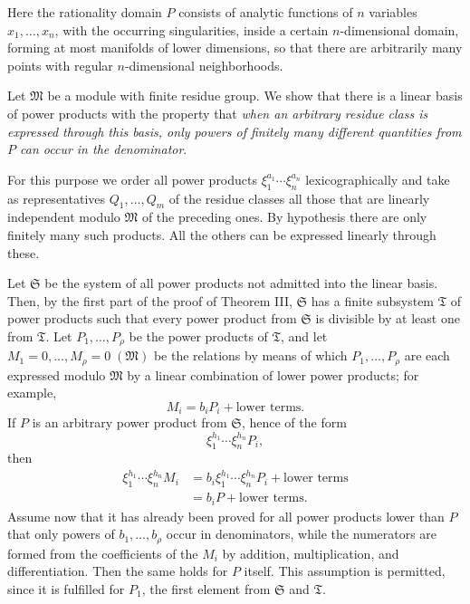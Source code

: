 \documentclass[11pt]{article}
\begin{document}
Here the rationality domain $P$ consists of analytic functions of $n$ variables $x_1,
\ldots,x_n$, with the occurring singularities, inside a certain $n$-dimensional domain, forming at most manifolds of lower dimensions, so that there are arbitrarily many points with regular $n$-dimensional neighborhoods.

Let $\mathfrak M$ be a module with finite residue group. We show that there is a linear basis of power products with the property that \emph{when an arbitrary residue class is expressed through this basis, only powers of finitely many different quantities from $P$ can occur in the denominator}.

For this purpose we order all power products $\xi_1^{a_1}\cdots\xi_n^{a_n}$ lexicographically and take as representatives $Q_1,
\ldots,Q_m$ of the residue classes all those that are linearly independent modulo $\mathfrak M$ of the preceding ones. By hypothesis there are only finitely many such products. All the others can be expressed linearly through these.

Let $\mathfrak S$ be the system of all power products not admitted into the linear basis. Then, by the first part of the proof of Theorem III, $\mathfrak S$ has a finite subsystem $\mathfrak T$ of power products such that every power product from $\mathfrak S$ is divisible by at least one from $\mathfrak T$. Let $P_1,
\ldots,P_\rho$ be the power products of $\mathfrak T$, and let $M_1=0,
\ldots,M_\rho=0\;(\mathfrak M)$ be the relations by means of which $P_1,
\ldots,P_\rho$ are each expressed modulo $\mathfrak M$ by a linear combination of lower power products; for example,
\[
 M_i=b_iP_i+\text{lower terms}.
\]
If $P$ is an arbitrary power product from $\mathfrak S$, hence of the form
\[
 \xi_1^{h_1}\cdots\xi_n^{h_n}P_i,
\]
then
\[
\begin{aligned}
 \xi_1^{h_1}\cdots\xi_n^{h_n}M_i
 &=b_i\xi_1^{h_1}\cdots\xi_n^{h_n}P_i+\text{lower terms}\\
 &=b_iP+\text{lower terms}.
\end{aligned}
\]
Assume now that it has already been proved for all power products lower than $P$ that only powers of $b_1,
\ldots,b_\rho$ occur in denominators, while the numerators are formed from the coefficients of the $M_i$ by addition, multiplication, and differentiation. Then the same holds for $P$ itself. This assumption is permitted, since it is fulfilled for $P_1$, the first element from $\mathfrak S$ and $\mathfrak T$.
\end{document}
